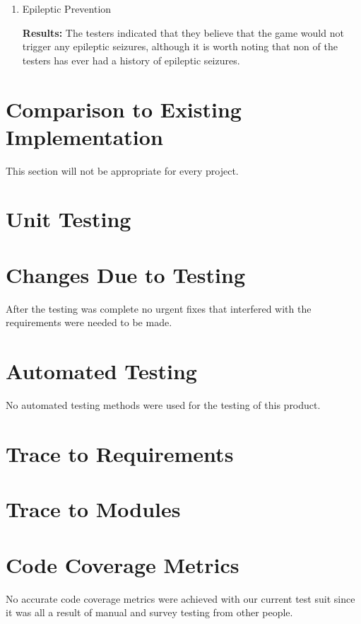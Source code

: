 \documentclass[12pt, titlepage]{article}
\begin{document}
\begin{enumerate}

\item{Epileptic Prevention\\}

\textbf{Results: }The testers indicated that they believe that the game would not trigger any epileptic seizures, although it is worth noting that non of the testers has ever had a history of epileptic seizures.

\end{enumerate}
	
\section{Comparison to Existing Implementation}	

This section will not be appropriate for every project.

\section{Unit Testing}

\section{Changes Due to Testing}
After the testing was complete no urgent fixes that interfered with the requirements were needed to be made.

\section{Automated Testing}
No automated testing methods were used for the testing of this product.
		
\section{Trace to Requirements}
		
\section{Trace to Modules}		

\section{Code Coverage Metrics}
No accurate code coverage metrics were achieved with our current test suit since it was all a result of manual and survey testing from other people. 




\end{document}
